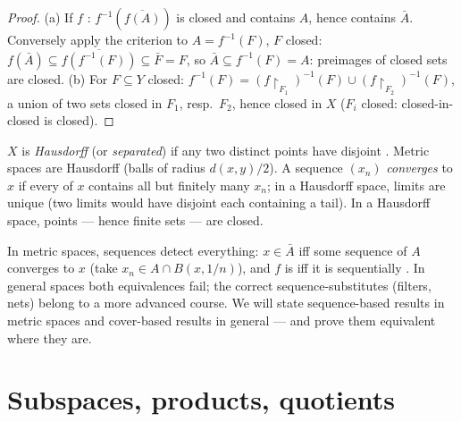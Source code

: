 \begin{proof}
(a) If $f$ : $f^{-1}(\overline{f(A)})$ is closed and
contains $A$, hence contains $\bar A$. Conversely apply the
criterion to $A = f^{-1}(F)$, $F$ closed: $f(\bar A) \subseteq
\overline{f(f^{-1}(F))} \subseteq \bar F = F$, so $\bar A
\subseteq f^{-1}(F) = A$: preimages of closed sets are closed.
(b) For $F \subseteq Y$ closed: $f^{-1}(F) =
(f\restriction_{F_1})^{-1}(F) \cup (f\restriction_{F_2})^{-1}
(F)$, a union of two sets closed in $F_1$, resp.\ $F_2$, hence
closed in $X$ ($F_i$ closed: closed-in-closed is closed).
\end{proof}

\begin{definition}\label{def:b3:topology:hausdorff}
$X$ is \emph{Hausdorff} (or
\emph{separated}) if any two distinct points have disjoint
. Metric spaces are Hausdorff (balls of radius
$d(x,y)/2$). A sequence $(x_n)$ \emph{converges} to $x$ if every
 of $x$ contains all but finitely many $x_n$; in a
Hausdorff space, limits are unique (two limits would have
disjoint  each containing a tail). In a Hausdorff
space, points --- hence finite sets --- are closed.
\end{definition}

\begin{remark}\label{rem:b3:topology:sequences}
In metric spaces, sequences detect everything: $x \in \bar A$
iff some sequence of $A$ converges to $x$ (take $x_n \in A \cap
B(x, 1/n)$), and $f$ is  iff it is sequentially
. In general spaces both equivalences fail; the
correct sequence-substitutes (filters, nets) belong to a more
advanced course. We will state sequence-based results in metric
spaces and cover-based results in general --- and prove them
equivalent where they are.
\end{remark}

\section{Subspaces, products, quotients}


